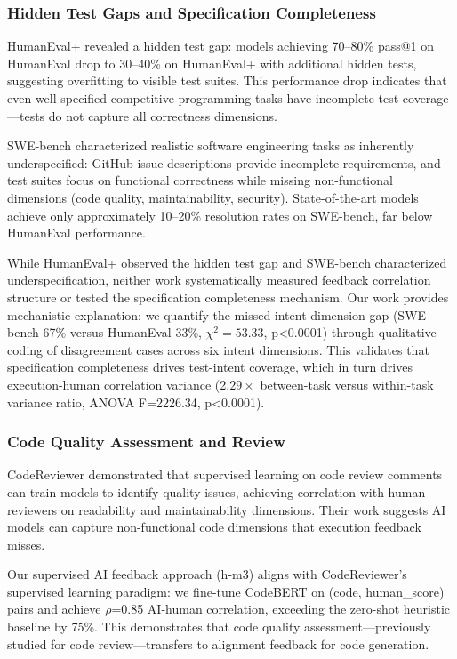 \subsubsection{Hidden Test Gaps and Specification Completeness}

HumanEval+ \citep{liu2023your} revealed a hidden test gap: models achieving 70--80\% pass@1 on HumanEval drop to 30--40\% on HumanEval+ with additional hidden tests, suggesting overfitting to visible test suites. This performance drop indicates that even well-specified competitive programming tasks have incomplete test coverage---tests do not capture all correctness dimensions.

SWE-bench \citep{jimenez2023swebench} characterized realistic software engineering tasks as inherently underspecified: GitHub issue descriptions provide incomplete requirements, and test suites focus on functional correctness while missing non-functional dimensions (code quality, maintainability, security). State-of-the-art models achieve only approximately 10--20\% resolution rates on SWE-bench, far below HumanEval performance.

While HumanEval+ observed the hidden test gap and SWE-bench characterized underspecification, neither work systematically measured feedback correlation structure or tested the specification completeness mechanism. Our work provides mechanistic explanation: we quantify the missed intent dimension gap (SWE-bench 67\% versus HumanEval 33\%, $\chi^{2}=53.33$, p<0.0001) through qualitative coding of disagreement cases across six intent dimensions. This validates that specification completeness drives test-intent coverage, which in turn drives execution-human correlation variance (2.$29\times$ between-task versus within-task variance ratio, ANOVA F=2226.34, p<0.0001).

\subsubsection{Code Quality Assessment and Review}

CodeReviewer \citep{li2022codereviewers} demonstrated that supervised learning on code review comments can train models to identify quality issues, achieving correlation with human reviewers on readability and maintainability dimensions. Their work suggests AI models can capture non-functional code dimensions that execution feedback misses.

Our supervised AI feedback approach (h-m3) aligns with CodeReviewer's supervised learning paradigm: we fine-tune CodeBERT on (code, human\_score) pairs and achieve $\rho$=0.85 AI-human correlation, exceeding the zero-shot heuristic baseline by 75\%. This demonstrates that code quality assessment---previously studied for code review---transfers to alignment feedback for code generation.

